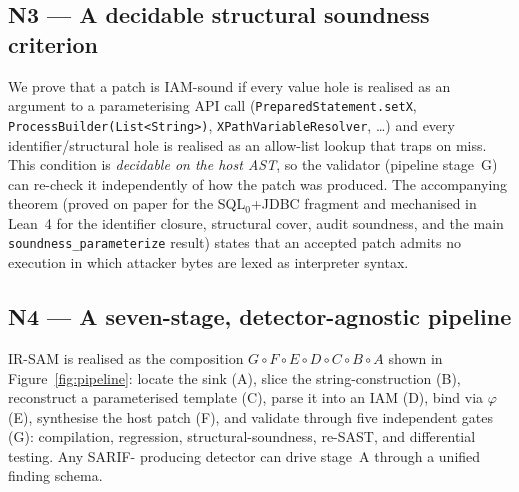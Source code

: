 \documentclass[11pt,a4paper]{article}
\newcommand{\irsam}{\mbox{IR\nobreakdash-SAM}}
\begin{document}
\subsection{N3 --- A decidable structural soundness criterion}
We prove that a patch is IAM-sound if every \textsf{value} hole is
realised as an argument to a parameterising API call
(\texttt{PreparedStatement.setX}, \texttt{ProcessBuilder(List<String>)},
\texttt{XPathVariableResolver}, \dots) and every
\textsf{identifier}/\textsf{structural} hole is realised as an allow-list
lookup that traps on miss. This condition is \emph{decidable on the host
AST}, so the validator (pipeline stage~G) can re-check it independently of
how the patch was produced. The accompanying theorem (proved on paper for
the SQL$_0$+JDBC fragment and mechanised in Lean~4 for the identifier
closure, structural cover, audit soundness, and the main
\texttt{soundness\_parameterize} result) states that an accepted patch
admits no execution in which attacker bytes are lexed as interpreter
syntax.

\subsection{N4 --- A seven-stage, detector-agnostic pipeline}
\irsam{} is realised as the composition
$G\circ F\circ E\circ D\circ C\circ B\circ A$ shown in
Figure~\ref{fig:pipeline}: locate the sink (A), slice the
string-construction (B), reconstruct a parameterised template (C), parse
it into an IAM (D), bind via $\varphi$ (E), synthesise the host patch (F),
and validate through five independent gates (G): compilation, regression,
structural-soundness, re-SAST, and differential testing. Any SARIF-
producing detector can drive stage~A through a unified finding schema.
\end{document}
